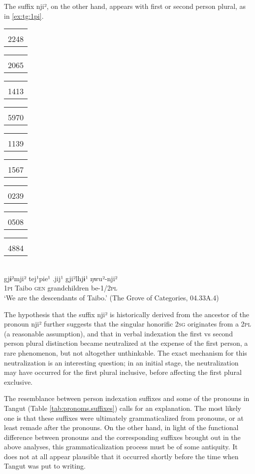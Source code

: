 \documentclass[oldfontcommands,oneside,a4paper,11pt]{article}
\newcommand{\ipa}[1]{{\phon \mbox{#1}}} %
\newcommand{\tgf}[1]{\begin{tabular}{l}\mo{#1}\\{\tiny #1}\end{tabular}}
\begin{document}
The suffix  \ipa{nji²}, on the other hand, appears with first or second person plural, as in \ref{ex:tg:1pi}.

\begin{exe}
\ex \label{ex:tg:1pi}  
\glll 
\tgf{2248}\tgf{2065} 	\tgf{1413}\tgf{5970} 	\tgf{1139} 	\tgf{1567}\tgf{0239} 	\tgf{0508}\tgf{4884} \\
\ipa{gjɨ²mji²} 	\ipa{tej¹pie¹} 	\ipa{.jij¹} 	\ipa{gji²lhjɨ¹} 	\ipa{ŋwu²-nji²} \\
\textsc{1pi} Taibo \textsc{gen} grandchildren be-\textsc{1/2pl} \\
\glt `We are the descendants of Taibo.' (The Grove of Categories, 04.33A.4) %
\end{exe}

The hypothesis that the suffix  \ipa{nji²} is historically derived from the ancestor of the pronoun  \ipa{nji²} further suggests that the singular honorific \textsc{2sg} originates from a \textsc{2pl} (a reasonable assumption), and that in verbal indexation the first vs second person plural distinction became neutralized at the expense of the first person, a rare phenomenon, but not altogether unthinkable. The exact mechanism for this neutralization is an interesting question; in an initial stage, the neutralization may have occurred for the first plural inclusive, before affecting the first plural exclusive.

The resemblance between person indexation suffixes and some of the pronouns in Tangut (Table \ref{tab:pronoms.suffixes}) calls for an explanation. The most likely one is that these suffixes were ultimately grammaticalized from pronouns, or at least remade after the pronouns. On the other hand, in light of the functional difference between pronouns and the corresponding suffixes brought out in the above analyses, this grammaticalization process must be of some antiquity. It does not at all appear plausible that it occurred shortly before the time when Tangut was put to writing.
\end{document}
